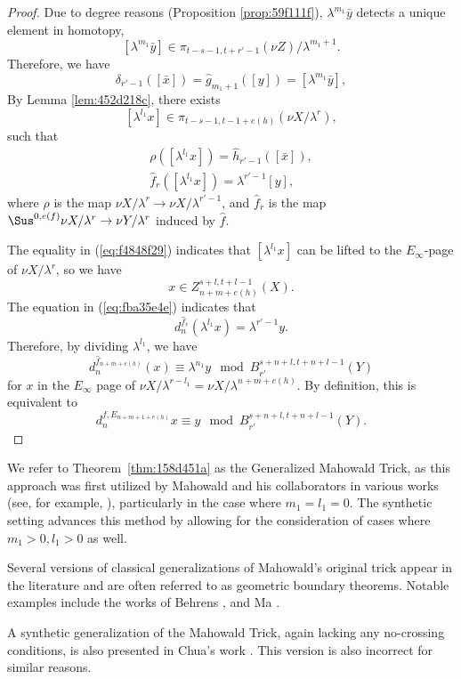 \documentclass{amsart}
\numberwithin{equation}{section}
\begin{document}
\begin{proof}
    Due to degree reasons (Proposition \ref{prop:59f111f}), $\lambda^{m_1}\bar y$ detects a unique element in homotopy,
    $$[\lambda^{m_1}\bar y]\in \pi_{t-s-1, t+r'-1}(\nu Z)/\lambda^{m_1+1}.$$
    Therefore, we have
    $$\delta_{r'-1}([\bar x])=\hat g_{m_1+1}([y])=[\lambda^{m_1}\bar y],$$
    By Lemma \ref{lem:452d218c}, there exists
    $$[\lambda^{l_1}x]\in \pi_{t-s-1,t-1+e(h)}(\nu X/\lambda^r),$$
    such that
    \begin{gather}
        \rho ([\lambda^{l_1}x])=\hat h_{r'-1}([\bar x]),\label{eq:f4848f29}\\
        \hat f_r([\lambda^{l_1}x])=\lambda^{r'-1}[y],\label{eq:fba35e4e}
    \end{gather}
    where $\rho$ is the map $\nu X/\lambda^r\to \nu X/\lambda^{r'-1}$, and $\hat f_r$ is the map $\Sus^{0,e(f)}\nu X/\lambda^r\to \nu Y/\lambda^r$ induced by $\hat f$.
    
    The equality in (\ref{eq:f4848f29}) indicates that $[\lambda^{l_1}x]$ can be lifted to the $E_\infty$-page of $\nu X/\lambda^r$, so we have
    $$x\in Z_{n+m+e(h)}^{s+l,t+l-1}(X).$$
    The equation in (\ref{eq:fba35e4e}) indicates that
    $$d^{\hat f_r}_n(\lambda^{l_1}x)=\lambda^{r'-1}y.$$
    Therefore, by dividing $\lambda^{l_1}$, we have
    $$d^{\hat f_{n+m+e(h)}}_n(x)\equiv \lambda^{n_1}y \mod B_{r'}^{s+n+l,t+n+l-1}(Y)$$
    for $x$ in the $E_\infty$ page of $\nu X/\lambda^{r-l_1}=\nu X/\lambda^{n+m+e(h)}$. By definition, this is equivalent to
    $$d^{f, E_{n+m+1+e(h)}}_nx\equiv y \mod B_{r'}^{s+n+l,t+n+l-1}(Y).$$
\end{proof}


    We refer to Theorem~\ref{thm:158d451a} as the Generalized Mahowald Trick, as this approach was first utilized by Mahowald and his collaborators in various works (see, for example, \cite{MahowaldTangora}), particularly in the case where $m_1 = l_1 = 0$. The synthetic setting advances this method by allowing for the consideration of cases where $m_1>0, l_1>0$ as well. 
    
\begin{remark}
    Several versions of classical generalizations of Mahowald's original trick appear in the literature and are often referred to as geometric boundary theorems. Notable examples include the works of Behrens \cite{Behrens}, and Ma \cite{Ma}.
\end{remark}

\begin{remark}
  A synthetic generalization of the Mahowald Trick, again lacking any no-crossing conditions, is also presented in Chua's work \cite[Theorem~12.11]{Chua}. This version is also incorrect for similar reasons.
\end{remark}
\end{document}

